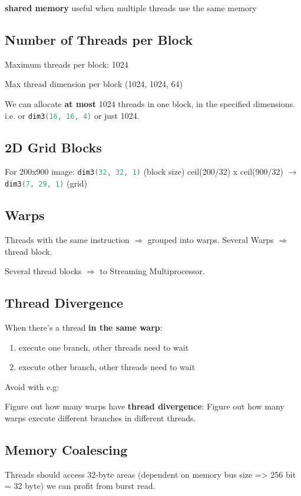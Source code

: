 \begin{multicols*}{4}
    \textbf{shared memory} useful when multiple threads use the same memory

	\subsection{Number of Threads per Block}
Maximum threads per block: 1024

Max thread dimension per block	(1024, 1024, 64)

We can allocate \textbf{at most} 1024 threads in one block, in the specified dimensions.
i.e.  or \lstinline[language=c]|dim3(16, 16, 4)| or just 1024.

	\subsection{2D Grid Blocks}
	For 200x900 image: \lstinline[language=c]|dim3(32, 32, 1)| (block size)
	ceil(200/32) x ceil(900/32) $\rightarrow$ \lstinline[language=c]|dim3(7, 29, 1)| (grid)

	\subsection{Warps}
	Threads with the same instruction $\Rightarrow$ grouped into warps.
	Several Warps $\Rightarrow$ thread block.

	Several thread blocks $\Rightarrow$ to Streaming Multiprocessor.

	\subsection{Thread Divergence}
	When there's a thread \textbf{in the same warp}:
	\begin{enumerate}
		\item execute one branch, other threads need to wait
		\item execute other branch, other threads need to wait
	\end{enumerate}
	Avoid with e.g: 

	Figure out how many warps have \textbf{thread divergence}: Figure out how many warps execute different branches in different threads.

	\subsection{Memory Coalescing}
	Threads should access 32-byte areas (dependent on memory bus size => 256 bit = 32 byte) we can profit from burst read.


\end{multicols*}
